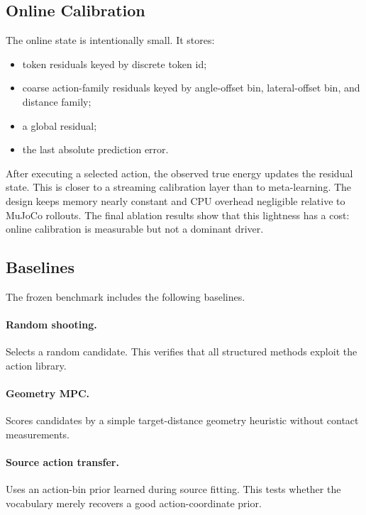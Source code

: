\documentclass{article}
\begin{document}
\subsection{Online Calibration}

The online state is intentionally small. It stores:

\begin{itemize}
\item token residuals keyed by discrete token id;
\item coarse action-family residuals keyed by angle-offset bin, lateral-offset bin, and distance family;
\item a global residual;
\item the last absolute prediction error.
\end{itemize}

After executing a selected action, the observed true energy updates the residual state. This is closer to a streaming calibration layer than to meta-learning. The design keeps memory nearly constant and CPU overhead negligible relative to MuJoCo rollouts. The final ablation results show that this lightness has a cost: online calibration is measurable but not a dominant driver.

\subsection{Baselines}

The frozen benchmark includes the following baselines.

\paragraph{Random shooting.}
Selects a random candidate. This verifies that all structured methods exploit the action library.

\paragraph{Geometry MPC.}
Scores candidates by a simple target-distance geometry heuristic without contact measurements.

\paragraph{Source action transfer.}
Uses an action-bin prior learned during source fitting. This tests whether the vocabulary merely recovers a good action-coordinate prior.
\end{document}
